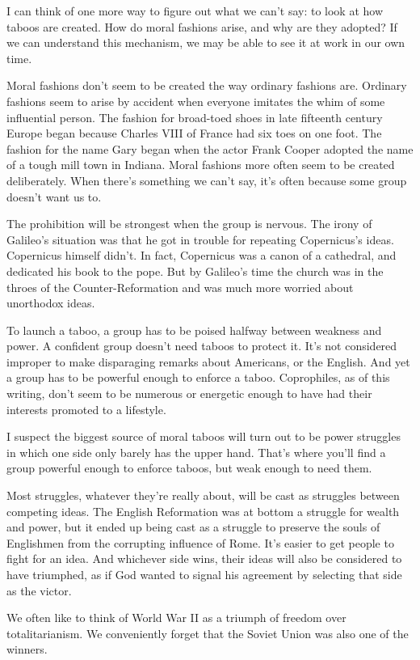 \documentclass[12pt]{book}
\begin{document}
I can think of one more way to figure out what we can't say: to look at
how taboos are created. How do moral fashions arise, and why are they
adopted? If we can understand this mechanism, we may be able to see it
at work in our own time.

Moral fashions don't seem to be created the way ordinary fashions are.
Ordinary fashions seem to arise by accident when everyone imitates the
whim of some influential person. The fashion for broad-toed shoes in
late fifteenth century Europe began because Charles VIII of France had
six toes on one foot. The fashion for the name Gary began when the actor
Frank Cooper adopted the name of a tough mill town in Indiana. Moral
fashions more often seem to be created deliberately. When there's
something we can't say, it's often because some group doesn't want us
to.

The prohibition will be strongest when the group is nervous. The irony
of Galileo's situation was that he got in trouble for repeating
Copernicus's ideas. Copernicus himself didn't. In fact, Copernicus was a
canon of a cathedral, and dedicated his book to the pope. But by
Galileo's time the church was in the throes of the Counter-Reformation
and was much more worried about unorthodox ideas.

To launch a taboo, a group has to be poised halfway between weakness and
power. A confident group doesn't need taboos to protect it. It's not
considered improper to make disparaging remarks about Americans, or the
English. And yet a group has to be powerful enough to enforce a taboo.
Coprophiles, as of this writing, don't seem to be numerous or energetic
enough to have had their interests promoted to a lifestyle.

I suspect the biggest source of moral taboos will turn out to be power
struggles in which one side only barely has the upper hand. That's where
you'll find a group powerful enough to enforce taboos, but weak enough
to need them.

Most struggles, whatever they're really about, will be cast as struggles
between competing ideas. The English Reformation was at bottom a
struggle for wealth and power, but it ended up being cast as a struggle
to preserve the souls of Englishmen from the corrupting influence of
Rome. It's easier to get people to fight for an idea. And whichever side
wins, their ideas will also be considered to have triumphed, as if God
wanted to signal his agreement by selecting that side as the victor.

We often like to think of World War II as a triumph of freedom over
totalitarianism. We conveniently forget that the Soviet Union was also
one of the winners.
\end{document}
